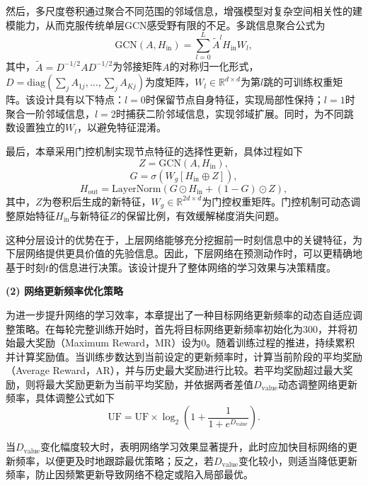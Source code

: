 然后，多尺度卷积通过聚合不同范围的邻域信息，增强模型对复杂空间相关性的建模能力，从而克服传统单层GCN感受野有限的不足。多跳信息聚合公式为
\begin{equation}\label{eq-41}\text{GCN}(A,H_{\text{in}}) = \sum_{l=0}^{L} \tilde{A}^l H_{\text{in}} W_l,\end{equation}
其中，$\tilde{A} = D^{-1/2} A D^{-1/2}$为邻接矩阵$A$的对称归一化形式，$D=\text{diag}(\sum_j A_{1j},\dots,\sum_j A_{Kj})$为度矩阵，$W_l\in\mathbb{R}^{d\times d}$为第$l$跳的可训练权重矩阵。该设计具有以下特点：$l=0$时保留节点自身特征，实现局部性保持；$l=1$时聚合一阶邻域信息，$l=2$时捕获二阶邻域信息，实现邻域扩展。同时，为不同跳数设置独立的$W_l$，以避免特征混淆。

最后，本章采用门控机制实现节点特征的选择性更新，具体过程如下
\begin{equation}\label{eq-42}Z=\text{GCN}(A,H_{\text{in}}), \end{equation}
\begin{equation}\label{eq-43}G=\sigma ( W_g [ H_{\text{in}}  \oplus Z ] ),\end{equation}
\begin{equation}\label{eq-44}H_{\text{out}}=\text{LayerNorm}( G\odot H_{\text{in}} + (1-G) \odot Z ), \end{equation}
其中，$Z$为卷积后生成的新特征，$W_g\in\mathbb{R}^{2d\times d}$为门控权重矩阵。门控机制可动态调整原始特征$H_{\text{in}}$与新特征$Z$的保留比例，有效缓解梯度消失问题。

这种分层设计的优势在于，上层网络能够充分挖掘前一时刻信息中的关键特征，为下层网络提供更具价值的先验信息。因此，下层网络在预测动作时，可以更精确地基于时刻$t$的信息进行决策。该设计提升了整体网络的学习效果与决策精度。

\textbf{(2) 网络更新频率优化策略}

为进一步提升网络的学习效率，本章提出了一种目标网络更新频率的动态自适应调整策略。在每轮完整训练开始时，首先将目标网络更新频率初始化为300，并将初始最大奖励（Maximum Reward，MR）设为0。随着训练过程的推进，持续累积并计算奖励值。当训练步数达到当前设定的更新频率时，计算当前阶段的平均奖励（Average Reward，AR），并与历史最大奖励进行比较。若平均奖励超过最大奖励，则将最大奖励更新为当前平均奖励，并依据两者差值$D_{\text{value}}$动态调整网络更新频率，具体调整公式如下
\begin{equation}\text{UF}=\text{UF}\times \log_{2}{\left ( 1+\frac{1}{1+e^{D_{\text{value}}} }  \right ) }. \end{equation}

当$D_{\text{value}}$变化幅度较大时，表明网络学习效果显著提升，此时应加快目标网络的更新频率，以便更及时地跟踪最优策略；反之，若$D_{\text{value}}$变化较小，则适当降低更新频率，防止因频繁更新导致网络不稳定或陷入局部最优。

